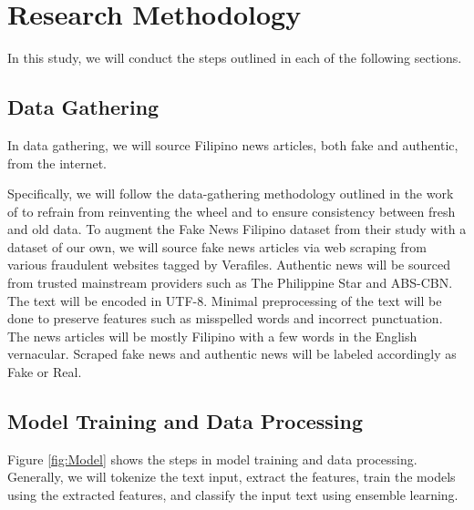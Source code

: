\chapter{Research Methodology}

In this study, we will conduct the steps outlined in each of the following sections.

\section{Data Gathering}

In data gathering, we will source Filipino news articles, both fake and authentic, from the internet.

Specifically, we will follow the data-gathering methodology outlined in the work of \cite{cruz2020localization} to refrain from reinventing the wheel and to ensure consistency between fresh and old data. To augment the Fake News Filipino dataset from their study with a dataset of our own, we will source fake news articles via web scraping from various fraudulent websites tagged by Verafiles. Authentic news will be sourced from trusted mainstream providers such as The Philippine Star and ABS-CBN. The text will be encoded in UTF-8. Minimal preprocessing of the text will be done to preserve features such as misspelled words and incorrect punctuation. The news articles will be mostly Filipino with a few words in the English vernacular. Scraped fake news and authentic news will be labeled accordingly as Fake or Real.

\section{Model Training and Data Processing}
\label{sec:ModelTraining}

Figure \ref{fig:Model} shows the steps in model training and data processing. Generally, we will tokenize the text input, extract the features, train the models using the extracted features, and classify the input text using ensemble learning.

